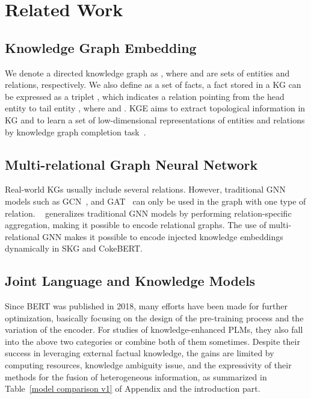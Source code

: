 \documentclass{article} \usepackage{iclr2022_conference,times}
\begin{document}
\section{Related Work}
\subsection{Knowledge Graph Embedding}
We denote a directed knowledge graph as , where  and  are sets of entities and relations, respectively. We also define  as a set of facts, a fact stored in a KG can be expressed as a triplet , which indicates a relation  pointing from the head entity  to tail entity , where  and . KGE aims to extract topological information in KG and to learn a set of low-dimensional representations of entities and relations by knowledge graph completion task~\citep{yang2015embedding, lu2020dense}. 

\subsection{Multi-relational Graph Neural Network}
Real-world KGs usually include several relations. However, traditional GNN models such as GCN~\citep{kipf2017semisupervised}, and GAT~\citep{GAT} can only be used in the graph with one type of relation. ~\citep{schlichtkrull2017modeling, haonan2019graph} generalizes traditional GNN models by performing relation-specific aggregation, making it possible to encode relational graphs. The use of multi-relational GNN makes it possible to encode injected knowledge embeddings dynamically in SKG and CokeBERT.

\subsection{Joint Language and Knowledge Models}
Since BERT was published in 2018, many efforts have been made for further optimization, basically focusing on the design of the pre-training process and the variation of the encoder. For studies of knowledge-enhanced PLMs, they also fall into the above two categories or combine both of them sometimes. Despite their success in leveraging external factual knowledge, the gains are limited by computing resources, knowledge ambiguity issue, and the expressivity of their methods for the fusion of heterogeneous information, as summarized in Table~\ref{model comparison v1} of Appendix and the introduction part.
\end{document}
